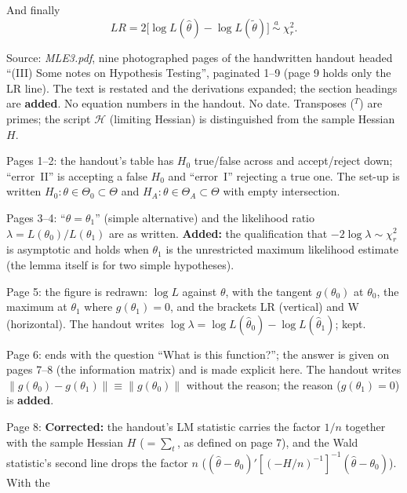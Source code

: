 \documentclass[11pt]{article}
\begin{document}
And finally
\[ LR=2\bigl[\log L(\hat\theta)-\log L(\tilde\theta)\bigr]\ \overset{a}{\sim}\ \chi^{2}_{r}. \]

\clearpage
\begin{transcriptnotes}
 \item Source: \emph{MLE3.pdf}, nine photographed pages of the handwritten handout headed
       ``(III) Some notes on Hypothesis Testing'', paginated 1--9 (page 9 holds only the LR line). The
       text is restated and the derivations expanded; the section headings are \textbf{added}. No
       equation numbers in the handout. No date. Transposes ($^{T}$) are primes; the script
       $\mathcal H$ (limiting Hessian) is distinguished from the sample Hessian $H$.
 \item Pages 1--2: the handout's table has $H_{0}$ true/false across and accept/reject down; ``error~II'' is
       accepting a false $H_{0}$ and ``error~I'' rejecting a true one. The set-up is written
       $H_{0}\colon\theta\in\Theta_{0}\subset\Theta$ and $H_{A}\colon\theta\in\Theta_{A}\subset\Theta$ with empty intersection.
 \item Pages 3--4: ``$\theta=\theta_{1}$'' (simple alternative) and the likelihood ratio
       $\lambda=L(\theta_{0})/L(\theta_{1})$ are as written. \textbf{Added:} the qualification that
       $-2\log\lambda\sim\chi^{2}_{r}$ is asymptotic and holds when $\theta_{1}$ is the unrestricted
       maximum likelihood estimate (the lemma itself is for two simple hypotheses).
 \item Page 5: the figure is redrawn: $\log L$ against $\theta$, with the tangent $g(\theta_{0})$ at
       $\theta_{0}$, the maximum at $\theta_{1}$ where $g(\theta_{1})=0$, and the brackets LR (vertical) and W
       (horizontal). The handout writes $\log\lambda=\log L(\hat\theta_{0})-\log L(\hat\theta_{1})$; kept.
 \item Page 6: ends with the question ``What is this function?''; the answer is given on pages 7--8
       (the information matrix) and is made explicit here. The handout writes
       $\lVert g(\theta_{0})-g(\theta_{1})\rVert\equiv\lVert g(\theta_{0})\rVert$ without the reason; the
       reason ($g(\theta_{1})=0$) is \textbf{added}.
 \item Page 8: \textbf{Corrected:} the handout's LM statistic carries the factor $1/n$ together with the
       sample Hessian $H$ ($=\sum_{t}$, as defined on page 7), and the Wald statistic's second line drops
       the factor $n$ ($(\hat\theta-\theta_{0})'[(-H/n)^{-1}]^{-1}(\hat\theta-\theta_{0})$). With the

\end{transcriptnotes}
\end{document}
